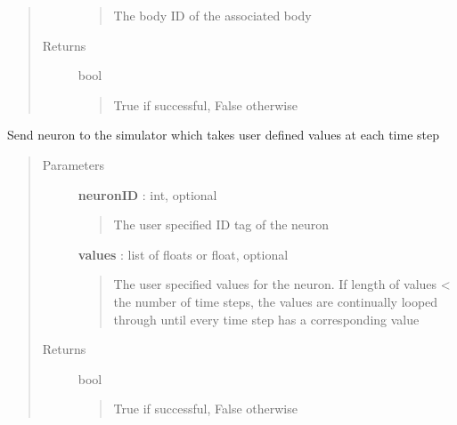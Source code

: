 \documentclass[letterpaper,10pt,english]{sphinxmanual}
\begin{document}
\begin{fulllineitems}
\begin{fulllineitems}
\begin{quote}
\begin{description}
\begin{quote}
The body ID of the associated body
\end{quote}

\item[{Returns}] \leavevmode
bool
\begin{quote}

True if successful, False otherwise
\end{quote}

\end{description}\end{quote}

\end{fulllineitems}


\begin{fulllineitems}
\label{code:pyrosim.PYROSIM.Send_User_Input_Neuron}
Send neuron to the simulator which takes user defined values at each time step
\begin{quote}\begin{description}
\item[{Parameters}] \leavevmode
\textbf{neuronID} : int, optional
\begin{quote}

The user specified ID tag of the neuron
\end{quote}

\textbf{values} : list of floats or float, optional
\begin{quote}

The user specified values for the neuron. If length of values \textless{} the number of
time steps, the values are continually looped through until every time step
has a corresponding value
\end{quote}

\item[{Returns}] \leavevmode
bool
\begin{quote}

True if successful, False otherwise
\end{quote}

\end{description}\end{quote}

\end{fulllineitems}



\end{fulllineitems}
\end{document}
